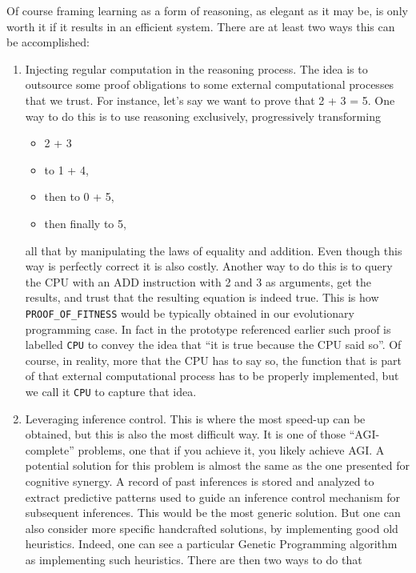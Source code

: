 \documentclass[]{report}
\begin{document}
Of course framing learning as a form of reasoning, as elegant as it
may be, is only worth it if it results in an efficient system.  There
are at least two ways this can be accomplished:
\begin{enumerate}
\item Injecting regular computation in the reasoning process.  The idea
is to outsource some proof obligations to some external computational
processes that we trust.  For instance, let's say we want to prove
that 2 + 3 = 5.  One way to do this is to use reasoning exclusively,
progressively transforming
\begin{itemize}
\item 2 + 3
\item to 1 + 4,
\item then to 0 + 5,
\item then finally to 5,
\end{itemize}
all that by manipulating the laws of equality and addition.  Even
though this way is perfectly correct it is also costly.  Another way
to do this is to query the CPU with an ADD instruction with 2 and 3 as
arguments, get the results, and trust that the resulting equation is
indeed true.  This is how \texttt{PROOF_OF_FITNESS} would
be typically obtained in our evolutionary programming case.  In fact
in the prototype referenced earlier such proof is
labelled \texttt{CPU} to convey the idea that ``it is true
because the CPU said so''.  Of course, in reality, more that the CPU
has to say so, the function that is part of that external
computational process has to be properly implemented, but we call
it \texttt{CPU} to capture that idea.
\item Leveraging inference control.  This is where the most speed-up can
   be obtained, but this is also the most difficult way.  It is one of
   those ``AGI-complete'' problems, one that if you achieve it, you
   likely achieve AGI.  A potential solution for this problem is
   almost the same as the one presented for cognitive synergy.  A
   record of past inferences is stored and analyzed to extract
   predictive patterns used to guide an inference control mechanism
   for subsequent inferences.  This would be the most generic
   solution.  But one can also consider more specific handcrafted
   solutions, by implementing good old heuristics.  Indeed, one can
   see a particular Genetic Programming algorithm as implementing such
   heuristics.  There are then two ways to do that
   \begin{enumerate}

\end{enumerate}
\end{enumerate}
\end{document}
